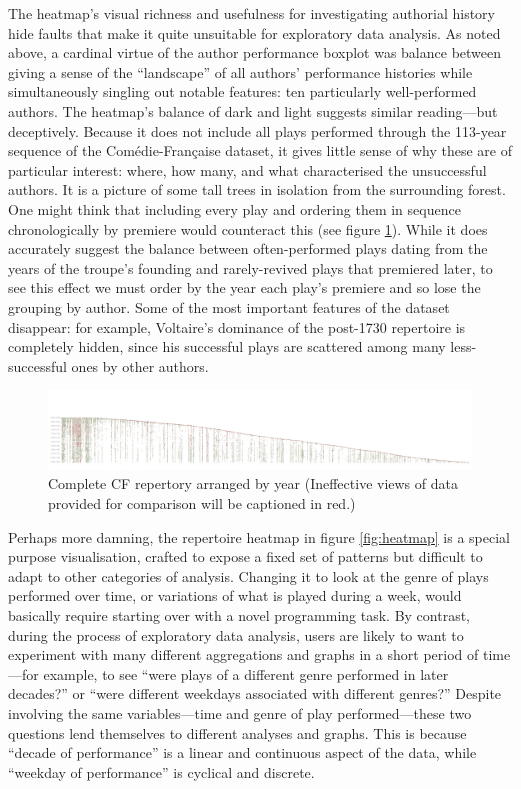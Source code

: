 \documentclass[	DIV=calc,%
							paper=a4,%
							fontsize=11pt,%
							twocolumn]{scrartcl}	 					%
\begin{document}
The heatmap’s visual richness and usefulness for investigating authorial history hide faults that make it quite unsuitable for exploratory data analysis.  As noted above, a cardinal virtue of the author performance boxplot was balance between giving a sense of the ``landscape'' of all authors’ performance histories while simultaneously singling out notable features: ten particularly well-performed authors.  The heatmap’s balance of dark and light suggests similar reading—but deceptively.  Because it does not include all plays performed through the 113-year sequence of the Comédie-Française dataset, it gives little sense of why these are of particular interest: where, how many, and what characterised the unsuccessful authors.  It is a picture of some tall trees in isolation from the surrounding forest.  One might think that including every play and ordering them in sequence chronologically by premiere would counteract this (see figure \ref{fig:heatmap_all}).  While it does accurately suggest the balance between often-performed plays dating from the years of the troupe’s founding and rarely-revived plays that premiered later, to see this effect we must order by the year each play’s premiere and so lose the grouping by author.  Some of the most important features of the dataset disappear: for example, Voltaire’s dominance of the post-1730 repertoire is completely hidden, since his successful plays are scattered among many less-successful ones by other authors.

\begin{figure}
  \centering
	\includegraphics[width=9in,angle=270]{viz/repertoire_by_season_all.pdf}
	\caption{\color{red}Complete CF repertory arranged by year
	         \newline
					 \color{black}(Ineffective views of data provided for comparison will be captioned in red.)}
  \label{fig:heatmap_all}
\end{figure}

Perhaps more damning, the repertoire heatmap in figure \ref{fig:heatmap} is a special purpose visualisation, crafted to expose a fixed set of patterns but difficult to adapt to other categories of analysis.  Changing it to look at the genre of plays performed over time, or variations of what is played during a week, would basically require starting over with a novel programming task.  By contrast, during the process of exploratory data analysis, users are likely to want to experiment with many different aggregations and graphs in a short period of time—for example, to see ``were plays of a different genre performed in later decades?'' or ``were different weekdays associated with different genres?''  Despite involving the same variables—time and genre of play performed—these two questions lend themselves to different analyses and graphs.  This is because ``decade of performance'' is a linear and continuous aspect of the data, while ``weekday of performance'' is cyclical and discrete.
\end{document}
